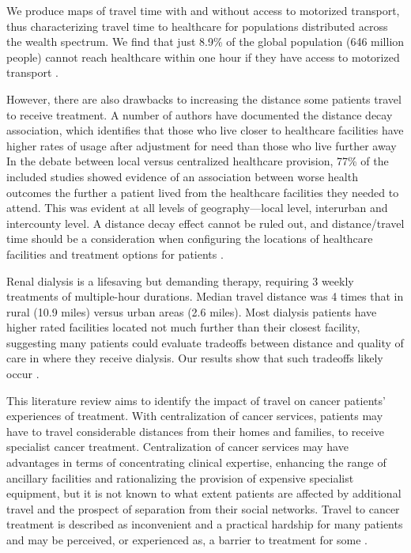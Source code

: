 We produce maps of travel time with and without access to motorized transport, thus characterizing travel time to healthcare for populations distributed across the wealth spectrum. We find that just 8.9\% of the global population (646 million people) cannot reach healthcare within one hour if they have access to motorized transport \cite{weiss_global_2020}.

However, there are also drawbacks to increasing the distance some patients travel to receive treatment. A number of authors have documented the distance decay association, which identifies that those who live closer to healthcare facilities have higher rates of usage after adjustment for need than those who live further away
In the debate between local versus centralized healthcare provision, 77\% of the included studies showed evidence of an association between worse health outcomes the further a patient lived from the healthcare facilities they needed to attend. This was evident at all levels of geography—local level, interurban and intercounty level. A distance decay effect cannot be ruled out, and distance/travel time should be a consideration when configuring the locations of healthcare facilities and treatment options for patients \cite{kelly_are_2016}.

Renal dialysis is a lifesaving but demanding therapy, requiring 3 weekly treatments of multiple-hour durations. Median travel distance was 4 times that in rural (10.9 miles) versus urban areas (2.6 miles). Most dialysis patients have higher rated facilities located not much further than their closest facility, suggesting many patients could evaluate tradeoffs between distance and quality of care in where they receive dialysis. Our results show that such tradeoffs likely occur \cite{salerno_understanding_2022}.

This literature review aims to identify the impact of travel on cancer patients' experiences of treatment. With centralization of cancer services, patients may have to travel considerable distances from their homes and families, to receive specialist cancer treatment. Centralization of cancer services may have advantages in terms of concentrating clinical expertise, enhancing the range of ancillary facilities and rationalizing the provision of expensive specialist equipment, but it is not known to what extent patients are affected by additional travel and the prospect of separation from their social networks. Travel to cancer treatment is described as inconvenient and a practical hardship for many patients and may be perceived, or experienced as, a barrier to treatment for some \cite{payne_impact_2000}.

